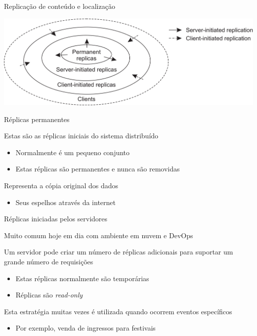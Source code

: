 \documentclass[compress]{beamer}
\begin{document}
\begin{frame}{Replicação de conteúdo e localização}

\vspace{0.7cm}

\centering \includegraphics[width=\textwidth]{images/replicas.png}

\end{frame}


\begin{frame}{Réplicas permanentes}

Estas são as réplicas iniciais do sistema distribuído
\begin{itemize}
    \item Normalmente é um pequeno conjunto 
    \item Estas réplicas são permanentes e nunca são removidas
\end{itemize}

\vspace{0.5cm}

Representa a cópia original dos dados
\begin{itemize}
    \item Seus espelhos através da internet
\end{itemize}
\end{frame}


\begin{frame}{Réplicas iniciadas pelos servidores}

Muito comum hoje em dia com ambiente em nuvem e DevOps

\vspace{0.5cm}

Um servidor pode criar um número de réplicas adicionais para suportar um grande número de requisições
\begin{itemize}
    \item Estas réplicas normalmente são temporárias
    \item Réplicas são \textit{read-only}
\end{itemize}

\vspace{0.5cm}

Esta estratégia muitas vezes é utilizada quando ocorrem eventos específicos
\begin{itemize}
    \item Por exemplo, venda de ingressos para festivais
\end{itemize}
\end{frame}
\end{document}
